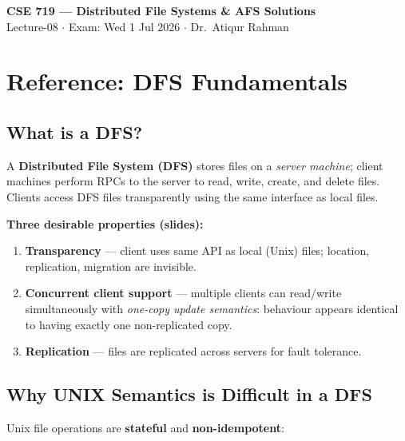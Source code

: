\documentclass[12pt,a4paper]{article}
\begin{document}
\begin{center}
  {\Large\bfseries CSE 719 --- Distributed File Systems \& AFS Solutions}\\[4pt]
  {\normalsize Lecture-08 $\cdot$ Exam: Wed 1 Jul 2026 $\cdot$ Dr.\ Atiqur Rahman}
\end{center}

\tableofcontents
\newpage

\section{Reference: DFS Fundamentals}

\subsection{What is a DFS?}
A \textbf{Distributed File System (DFS)} stores files on a \emph{server machine}; client machines perform RPCs to the server to read, write, create, and delete files. Clients access DFS files transparently using the same interface as local files.

\textbf{Three desirable properties (slides):}
\begin{enumerate}[noitemsep]
  \item \textbf{Transparency} --- client uses same API as local (Unix) files; location, replication, migration are invisible.
  \item \textbf{Concurrent client support} --- multiple clients can read/write simultaneously with \emph{one-copy update semantics}: behaviour appears identical to having exactly one non-replicated copy.
  \item \textbf{Replication} --- files are replicated across servers for fault tolerance.
\end{enumerate}

\subsection{Why UNIX Semantics is Difficult in a DFS}

Unix file operations are \textbf{stateful} and \textbf{non-idempotent}:
\end{document}
